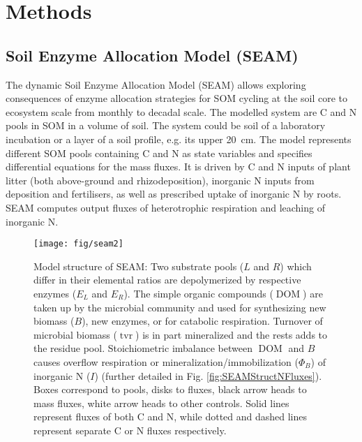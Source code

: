 \section{Methods}
\subsection{Soil Enzyme Allocation Model (SEAM)}
\label{sec:SEAM}

The dynamic Soil Enzyme Allocation Model (SEAM) allows exploring consequences of
enzyme allocation strategies for SOM cycling at the soil core to ecosystem
scale from monthly to decadal scale. The modelled system are C and N pools in
SOM in a volume of soil. The system could be soil of a
laboratory incubation or a layer of a soil profile, e.g. its upper 20~\unit{cm}.
The model represents different SOM pools containing C and N as state variables
and specifies differential equations for the mass fluxes. It is driven by C and
N inputs of plant litter (both above-ground and rhizodeposition), inorganic N
inputs from deposition and fertilisers, as well as prescribed uptake of
inorganic N by roots. SEAM computes output fluxes of heterotrophic respiration
and leaching of inorganic N.

\begin{figure}[t] \vspace*{2mm}
\begin{center}
\texttt{[image: fig/seam2]}
\end{center}
\caption{
Model structure of SEAM: Two substrate pools ($L$ and $R$) which differ in their
elemental ratios are depolymerized by respective enzymes ($E_L$ and $E_R$). The
simple organic compounds ($\operatorname{DOM}$) are taken up by the microbial
community  and used for synthesizing new biomass (${B}$), new enzymes, or for
catabolic respiration. Turnover of microbial biomass ($\operatorname{tvr}$) is
in part mineralized and the rests adds to the residue pool.
Stoichiometric imbalance between $\operatorname{DOM}$ and ${B}$ causes overflow
respiration or mineralization/immobilization ($\Phi_B$) of inorganic N ($I$)
(further detailed in Fig. \ref{fig:SEAMStructNFluxes}).
Boxes correspond to pools, disks to fluxes, black arrow heads to mass fluxes,
white arrow heads to other controls. Solid lines represent fluxes of both C and
N, while dotted and dashed lines represent separate C or N fluxes respectively.
\label{fig:SEAMStruct}
}
\end{figure}

